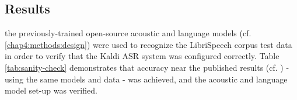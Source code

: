 





\subsection{Results}
\label{chap4:results}

the previously-trained open-source acoustic and language models (cf. \ref{chap4:methods:design}) were used to recognize the LibriSpeech corpus test data in order to verify that the Kaldi ASR system was configured correctly.  Table \ref{tab:sanity-check} demonstrates that accuracy near the published results (cf. \cite{panayotov:15}) - using the same models and data - was achieved, and the acoustic and language model set-up was verified.

